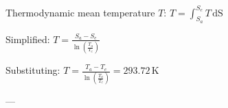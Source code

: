 Thermodynamic mean temperature \( T \):  
\( T = \int_{S_a}^{S_e} T \, \text{dS} \)  

Simplified:  
\( T = \frac{S_a - S_e}{\ln \left( \frac{T_a}{T_e} \right)} \)  

Substituting:  
\( T = \frac{T_a - T_e}{\ln \left( \frac{T_a}{T_e} \right)} = 293.72 \, \text{K} \)  

---